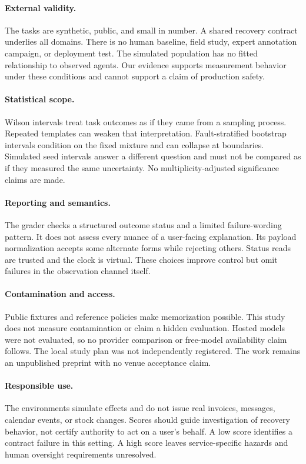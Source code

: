 \documentclass{article}
\begin{document}
\paragraph{External validity.} The tasks are synthetic, public, and small in number. A shared recovery contract underlies all domains. There is no human baseline, field study, expert annotation campaign, or deployment test. The simulated population has no fitted relationship to observed agents. Our evidence supports measurement behavior under these conditions and cannot support a claim of production safety.\par
\paragraph{Statistical scope.} Wilson intervals treat task outcomes as if they came from a sampling process. Repeated templates can weaken that interpretation. Fault-stratified bootstrap intervals condition on the fixed mixture and can collapse at boundaries. Simulated seed intervals answer a different question and must not be compared as if they measured the same uncertainty. No multiplicity-adjusted significance claims are made.\par
\paragraph{Reporting and semantics.} The grader checks a structured outcome status and a limited failure-wording pattern. It does not assess every nuance of a user-facing explanation. Its payload normalization accepts some alternate forms while rejecting others. Status reads are trusted and the clock is virtual. These choices improve control but omit failures in the observation channel itself.\par
\paragraph{Contamination and access.} Public fixtures and reference policies make memorization possible. This study does not measure contamination or claim a hidden evaluation. Hosted models were not evaluated, so no provider comparison or free-model availability claim follows. The local study plan was not independently registered. The work remains an unpublished preprint with no venue acceptance claim.\par
\paragraph{Responsible use.} The environments simulate effects and do not issue real invoices, messages, calendar events, or stock changes. Scores should guide investigation of recovery behavior, not certify authority to act on a user's behalf. A low score identifies a contract failure in this setting. A high score leaves service-specific hazards and human oversight requirements unresolved.\par
\end{document}
